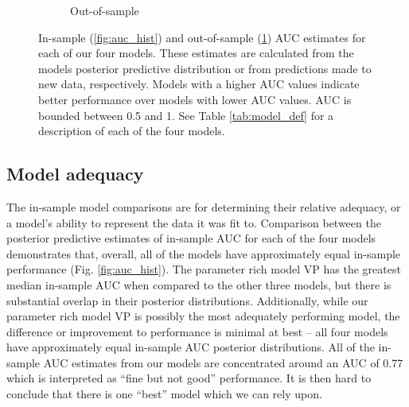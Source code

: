 \documentclass[12pt,letterpaper]{article}
\begin{document}
\begin{figure}[ht]
\begin{subfigure}[ht]{0.45\textwidth}
    \caption{Out-of-sample}
    \label{fig:fold_auc}
  \end{subfigure}
  \caption{In-sample (\ref{fig:auc_hist}) and out-of-sample (\ref{fig:fold_auc}) AUC estimates for each of our four models. These estimates are calculated from the models posterior predictive distribution or from predictions made to new data, respectively. Models with a higher AUC values indicate better performance over models with lower AUC values. AUC is bounded between 0.5 and 1. See Table \ref{tab:model_def} for a description of each of the four models.}
  \label{fig:auc_compare}
\end{figure}

\subsection{Model adequacy}

The in-sample model comparisons are for determining their relative adequacy, or a model's ability to represent the data it was fit to. Comparison between the posterior predictive estimates of in-sample AUC for each of the four models demonstrates that, overall, all of the models have approximately equal in-sample performance (Fig. \ref{fig:auc_hist}). The parameter rich model VP has the greatest median in-sample AUC when compared to the other three models, but there is substantial overlap in their posterior distributions. Additionally, while our parameter rich model VP is possibly the most adequately performing model, the difference or improvement to performance is minimal at best -- all four models have approximately equal in-sample AUC posterior distributions. All of the in-sample AUC estimates from our models are concentrated around an AUC of 0.77 which is interpreted as ``fine but not good'' performance. It is then hard to conclude that there is one ``best'' model which we can rely upon. 

\end{document}
